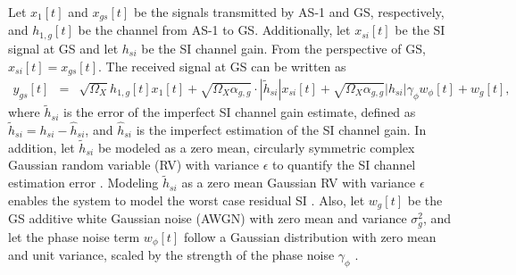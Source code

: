 Let $x_1[t]$ and $x_{gs}[t]$ be the signals transmitted by AS-1 and GS, respectively, and $h_{1,g}[t]$ be the channel from AS-1 to GS. Additionally, let $x_{si}[t]$ be the SI signal at GS and let $h_{si}$ be the SI channel gain. From the perspective of GS, $x_{si}[t]=x_{gs}[t]$. The received signal at GS can be written as 
\begin{eqnarray} \label{y_gs}
y_{gs}[t] & = & \sqrt{\Omega_{X}}h_{1,g}[t]x_{1}[t] + \sqrt{\Omega_X\alpha_{g,g}} \cdot |\widetilde{h}_{si}|x_{si}[t] + \sqrt{\Omega_X\alpha_{g,g}}|h_{si}|\gamma_{\phi}w_{\phi}[t] + w_{g}[t],
\end{eqnarray}
where $\widetilde{h}_{si}$ is the error of the imperfect SI channel gain estimate, defined as $\widetilde{h}_{si}=h_{si}-\widehat{h}_{si}$, and $\widehat{h}_{si}$ is the imperfect estimation of the SI channel gain. In addition, let $\widetilde{h}_{si}$ be modeled as a zero mean, circularly symmetric complex Gaussian random variable (RV) with variance $\epsilon$ to quantify the SI channel estimation error \cite{zlatanov2017capacity}. Modeling $\widetilde{h}_{si}$ as a zero mean Gaussian RV with variance $\epsilon$ enables the system to model the worst case residual SI \cite{zlatanov2017capacity}. Also, let $w_{g}[t]$ be the GS additive white Gaussian noise (AWGN) with zero mean and variance $\sigma^2_{g}$, and let the phase noise term $w_{\phi}[t]$ follow a Gaussian distribution with zero mean and unit variance, scaled by the strength of the phase noise $\gamma_{\phi}$ \cite{sahai2013impact}. 

